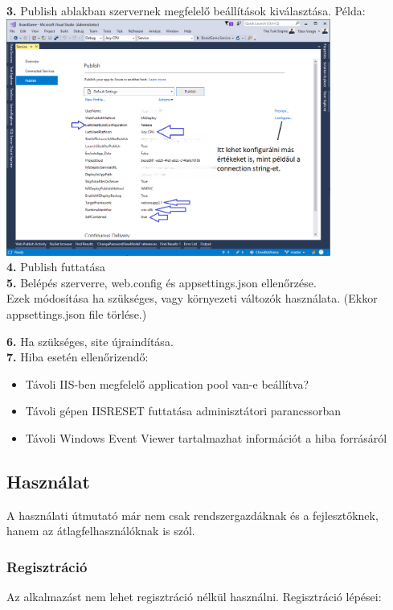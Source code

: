 \documentclass[twoside, a4paper, 12pt]{article}
\begin{document}
\noindent \textbf{3.} Publish ablakban szervernek megfelelő beállítások kiválasztása. Példa: \\
\includegraphics[width=0.8\textwidth]{img/server_prod_run_6.png} \\

\noindent \textbf{4.} Publish futtatása \\

\noindent \textbf{5.} Belépés szerverre, web.config és appsettings.json ellenőrzése. \\
Ezek módosítása ha szükséges, vagy környezeti változók használata. (Ekkor appsettings.json file törlése.)

\noindent \textbf{6.} Ha szükséges, site újraindítása. \\

\noindent \textbf{7.} Hiba esetén ellenőrizendő:
\begin{itemize}
	\item Távoli IIS-ben megfelelő application pool van-e beállítva?
	\item Távoli gépen IISRESET futtatása adminisztátori parancssorban
	\item Távoli Windows Event Viewer tartalmazhat információt a hiba forrásáról
\end{itemize}

\subsection{Használat}
A használati útmutató már nem csak rendszergazdáknak és a fejlesztőknek, hanem az átlagfelhasználóknak is szól.
\subsubsection{Regisztráció}
Az alkalmazást nem lehet regisztráció nélkül használni. Regisztráció lépései:\\
\end{document}
